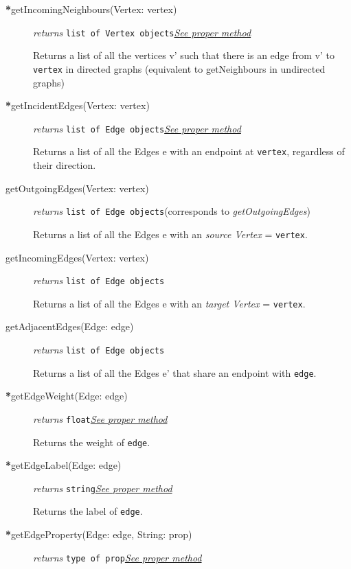 \begin{description}
\item[\textbf{*}getIncomingNeighbours(Vertex: vertex)]\emph{returns} \texttt{list of Vertex objects}\quad \hyperref[getIncomingNeighboursClass]{\textit{See proper method}}

Returns a list of all the vertices v' such that there is an edge from v' to \texttt{vertex} in directed graphs (equivalent to getNeighbours in undirected graphs)

\item[\textbf{*}getIncidentEdges(Vertex: vertex)]\emph{returns} \texttt{list of Edge objects}\quad \hyperref[getIncidentEdgesClass]{\textit{See proper method}}


Returns a list of all the Edges e with an endpoint at \texttt{vertex}, regardless of their direction.

\label{getOutgoingEdgesClass}\item[getOutgoingEdges(Vertex: vertex)]\emph{returns} \texttt{list of Edge objects}\quad(corresponds to \textit{getOutgoingEdges})

Returns a list of all the Edges e with an \textit{source Vertex} = \texttt{vertex}.

\item[getIncomingEdges(Vertex: vertex)]\emph{returns} \texttt{list of Edge objects}

Returns a list of all the Edges e with an \textit{target Vertex} = \texttt{vertex}.

\item[getAdjacentEdges(Edge: edge)]\emph{returns}
  \texttt{list of Edge objects}

Returns a list of all the Edges e' that share an endpoint with \texttt{edge}.

\item[\textbf{*}getEdgeWeight(Edge: edge)]\emph{returns} \texttt{float}\quad \hyperref[getEdgeWeightClass]{\textit{See proper method}}

Returns the weight of \texttt{edge}.

\item[\textbf{*}getEdgeLabel(Edge: edge)]\emph{returns} \texttt{string}\quad \hyperref[getEdgeLabelClass]{\textit{See proper method}}

Returns the label of \texttt{edge}.

\item[\textbf{*}getEdgeProperty(Edge: edge, String: prop)]\emph{returns} \texttt{type of prop}\quad \hyperref[getEdgePropertyClass]{\textit{See proper method}}


\end{description}
